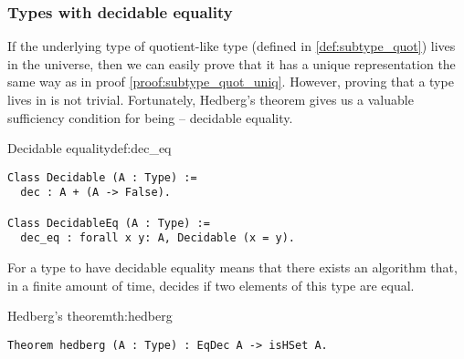\subsubsection{Types with decidable equality}
If the underlying type of quotient-like type (defined in \ref{def:subtype_quot}) lives in the  universe, then we can easily prove that it has a unique representation the same way as in proof \ref{proof:subtype_quot_uniq}. However, proving that a type lives in  is not trivial. Fortunately, Hedberg's theorem \cite{hedberg_1998} gives us a valuable sufficiency condition for being  -- decidable equality.
\begin{defi}{Decidable equality}{def:dec_eq}
\begin{verbatim}
Class Decidable (A : Type) :=
  dec : A + (A -> False).
  
Class DecidableEq (A : Type) :=
  dec_eq : forall x y: A, Decidable (x = y).
\end{verbatim}
\end{defi}
For a type to have decidable equality means that there exists an algorithm that, in a finite amount of time, decides if two elements of this type are equal.
\begin{theo}{Hedberg's theorem}{th:hedberg}
\begin{verbatim}
Theorem hedberg (A : Type) : EqDec A -> isHSet A.
\end{verbatim}
\end{theo}
